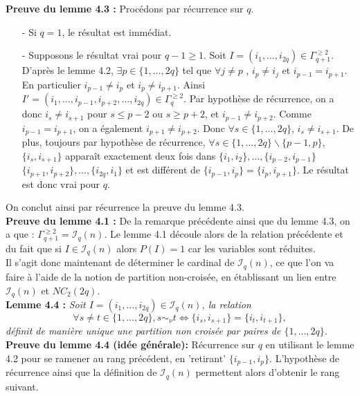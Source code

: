 \documentclass[10pt,a4paper]{article}
\begin{document}
\textbf{Preuve du lemme 4.3 :} Procédons par récurrence sur $q$. 
\begin{itemize}
\item[-] Si $q=1$, le résultat est immédiat.
\item[-] Supposons le résultat vrai pour $q-1 \geq 1$. Soit $ I=(i_1,\dots,i_{2q})\in \Gamma^{\geq 2}_{q+1} $. D'après le lemme 4.2, $\exists p \in \{1,\dots,2q\}$ tel que $\forall j \neq p$ , $i_p \neq i_j $ et $i_{p-1}=i_{p+1}$. En particulier $i_{p-1} \neq i_{p}$ et $i_p \neq i_{p+1}$. Ainsi $I'=(i_1,\dots ,i_{p-1},i_{p+2},\dots ,i_{2q}) \in \Gamma^{\geq 2}_{q} $. Par hypothèse de récurrence, on a donc $i_s \neq i_{s+1}$ pour $s \leq p-2$ ou $s \geq p+2$, et $i_{p-1} \neq i_{p+2}$. Comme $i_{p-1} = i_{p+1}$, on a également $i_{p+1} \neq i_{p+2}$. Donc $\forall s \in \{1,\dots,2q\}$, $i_s \neq i_{s+1} $. De plus, toujours par hypothèse de récurrence,  $\forall s \in \{1,\dots,2q\} \backslash \{ p-1 ,p \}$, $\{i_s,i_{s+1}\}$ apparaît exactement deux fois dans $\{ i_1,i_2 \},\dots,\{ i_{p-2},i_{p-1} \}$ $\{ i_{p+1},i_{p+2} \},\dots,\{ i_{2q},i_1 \}$ et est différent de $\{ i_{p-1},i_{p} \}= \{ i_{p},i_{p+1} \}$. Le résultat est donc vrai pour $q$. 
\end{itemize}
On conclut ainsi par récurrence la preuve du lemme 4.3.\\ 

\textbf{Preuve du lemme 4.1 :} De la remarque précédente ainsi que du lemme 4.3, on a que : $\Gamma^{\geq 2}_{q+1} = \mathcal{I}_q(n) $. Le lemme 4.1 découle alors de la relation précédente et du fait que si $I \in \mathcal{I}_q(n) $ alors $P(I)=1$ car les variables sont réduites.\\

Il s'agit donc maintenant de déterminer le cardinal de $\mathcal{I}_q(n)$, ce que l'on va faire à l'aide de la notion de partition non-croisée, en établissant un lien entre $\mathcal{I}_q(n)$ et $NC_2(2q)$.\\

\textbf{Lemme 4.4 : }\textit{Soit $I=(i_1,\dots,i_{2q}) \in \mathcal{I}_q(n)$, la relation \[\forall s \neq t \in \{1,\dots,2q\}, s \sim_{\nu} t \Leftrightarrow \{i_s,i_{s+1}\}=\{i_t,i_{t+1}\}, \] définit de manière unique une partition non croisée par paires de $\{1,\dots,2q\}$.  }\\

\textbf{Preuve du lemme 4.4 (idée générale):} Récurrence sur $q$ en utilisant le lemme 4.2 pour se ramener au rang précédent, en 'retirant' $\{ i_{p-1},i_p \}$. L'hypothèse de récurrence ainsi que la définition de $\mathcal{I}_q(n)$ permettent alors d'obtenir le rang suivant.\\
\end{document}

